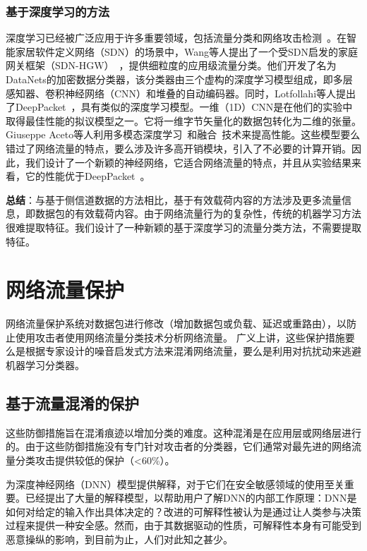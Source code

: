 \documentclass[degree=master,cjk-font=noto]{thuthesis}
\begin{document}
\subsubsection{基于深度学习的方法}

深度学习已经被广泛应用于许多重要领域，包括流量分类和网络攻击检测~\cite{iot_attack_detection}。在智能家居软件定义网络（SDN）的场景中，Wang等人提出了一个受SDN启发的家庭网关框架（SDN-HGW）~\cite{SDN_HGW}，提供细粒度的应用级流量分类。他们开发了名为DataNets的加密数据分类器，该分类器由三个虚构的深度学习模型组成，即多层感知器、卷积神经网络（CNN）和堆叠的自动编码器。同时，Lotfollahi等人提出了DeepPacket~\cite{deep_packet}，具有类似的深度学习模型。一维（1D）CNN是在他们的实验中取得最佳性能的拟议模型之一。它将一维字节矢量化的数据包转化为二维的张量。Giuseppe Aceto等人利用多模态深度学习~\cite{MIMETIC}和融合~\cite{mobile_app_class}技术来提高性能。这些模型要么错过了网络流量的特点，要么涉及许多高开销模块，引入了不必要的计算开销。因此，我们设计了一个新颖的神经网络，它适合网络流量的特点，并且从实验结果来看，它的性能优于DeepPacket~\cite{deep_packet}。

\textbf{总结}：与基于侧信道数据的方法相比，基于有效载荷内容的方法涉及更多流量信息，即数据包的有效载荷内容。由于网络流量行为的复杂性，传统的机器学习方法很难提取特征。我们设计了一种新颖的基于深度学习的流量分类方法，不需要提取特征。

\section{网络流量保护}

网络流量保护系统对数据包进行修改（增加数据包或负载、延迟或重路由），以防止使用攻击者使用网络流量分类技术分析网络流量。
广义上讲，这些保护措施要么是根据专家设计的噪音启发式方法来混淆网络流量，要么是利用对抗扰动来逃避机器学习分类器。

\subsection{基于流量混淆的保护}

这些防御措施旨在混淆痕迹以增加分类的难度。这种混淆是在应用层或网络层进行的。由于这些防御措施没有专门针对攻击者的分类器，它们通常对最先进的网络流量分类攻击提供较低的保护（<60\%）。

为深度神经网络（DNN）模型提供解释，对于它们在安全敏感领域的使用至关重要。已经提出了大量的解释模型，以帮助用户了解DNN的内部工作原理：DNN是如何对给定的输入作出具体决定的？改进的可解释性被认为是通过让人类参与决策过程来提供一种安全感。然而，由于其数据驱动的性质，可解释性本身有可能受到恶意操纵的影响，到目前为止，人们对此知之甚少。
\end{document}
